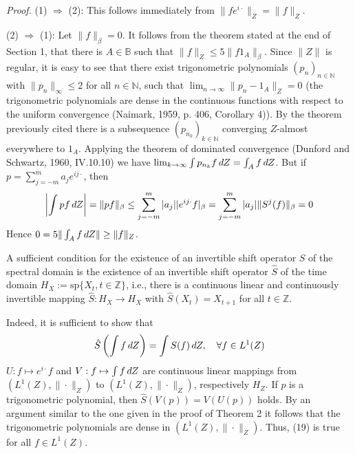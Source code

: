 \documentclass{article}
\newcommand{\assign}{:=}
\newcommand{\tmem}[1]{{\em #1\/}}
\begin{document}
{\tmem{Proof.}} (1) $\Rightarrow$ (2): This follows immediately from $\|fe^{i
\cdot} \|_Z = \|f\|_Z$.

(2) $\Rightarrow$ (1): Let $\|f\|_{\beta} = 0$. It follows from the theorem
stated at the end of Section 1, that there is $A \in \mathbb{B}$ such that
$\|f\|_Z \leq 5 \|f 1_A \|_{\beta}$. Since $\|Z\|$ is regular, it is easy to
see that there exist trigonometric polynomials $(p_n)_{n \in \mathbb{N}}$ with
$\|p_n \|_{\infty} \leq 2$ for all $n \in \mathbb{N}$, such that $\lim_{n \to
\infty} \|p_n - 1_A \|_Z = 0$ (the trigonometric polynomials are dense in the
continuous functions with respect to the uniform convergence (Naimark, 1959,
p. 406, Corollary 4)). By the theorem previously cited there is a subsequence
$(p_{n_k})_{k \in \mathbb{N}}$ converging $Z$-almost everywhere to $1_A$.
Applying the theorem of dominated convergence (Dunford and Schwartz, 1960,
IV.10.10) we have $\lim_{k \to \infty}  \int p_{n_k} f \hspace{0.17em} dZ =
\int_A f \hspace{0.17em} dZ$. But if $p = \sum_{j = - m}^m a_j e^{ij \cdot}$,
then
\begin{equation}
  \left| \int pf \hspace{0.17em} dZ \right| = \|pf\|_{\beta} \leq \sum_{j = -
  m}^m |a_j |  | e^{ij \cdot} f |_{\beta} = \sum_{j = - m}^m |a_j | \|S^j
  (f)\|_{\beta} = 0
\end{equation}
Hence $0 = 5 \| \int_A f \hspace{0.17em} dZ\| \geq \|f\|_Z$.

\begin{remark}
  A sufficient condition for the existence of an invertible shift operator $S$
  of the spectral domain is the existence of an invertible shift operator
  $\hat{S}$ of the time domain $H_X \assign \mathrm{sp} \{X_t, t \in
  \mathbb{Z}\}$, i.e., there is a continuous linear and continuously
  invertible mapping $\hat{S} : H_X \to H_X$ with $\hat{S} (X_t) = X_{t + 1}$
  for all $t \in \mathbb{Z}$.
  
  Indeed, it is sufficient to show that
  \begin{equation}
    \hat{S} \left( \int f \hspace{0.17em} dZ \right) = \int S (f) 
    \hspace{0.17em} dZ, \quad \forall f \in L^1 (Z)
  \end{equation}
  $U : f \mapsto e^{i \cdot} f$ and $V : f \mapsto \int f \hspace{0.17em} dZ$
  are continuous linear mappings from $(L^1 (Z), \| \cdot \|_Z)$ to $(L^1 (Z),
  \| \cdot \|_Z)$, respectively $H_Z$. If $p$ is a trigonometric polynomial,
  then $\hat{S} (V (p)) = V (U (p))$ holds. By an argument similar to the one
  given in the proof of Theorem 2 it follows that the trigonometric
  polynomials are dense in $(L^1 (Z), \| \cdot \|_Z)$. Thus, (19) is true for
  all $f \in L^1 (Z)$.
\end{remark}
\end{document}
